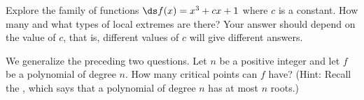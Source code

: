 \begin{enumialphparenastyle}
\begin{ex}
	Explore the family of functions $\ds f(x) = x^3 + cx +1$ where $c$
	is a constant.  How many and what types of local extremes are there?
	Your answer should depend on the value of $c$, that is, different
	values of $c$ will give different answers.
\end{ex}

\begin{ex}
	We generalize the preceding two questions. Let $n$ be a
	positive integer and let $f$ be a polynomial of degree $n$. How many
	critical points can $f$ have? (Hint: Recall the , 
	which says that a polynomial of degree $n$ has
	at most $n$ roots.)
\end{ex}

\end{enumialphparenastyle}